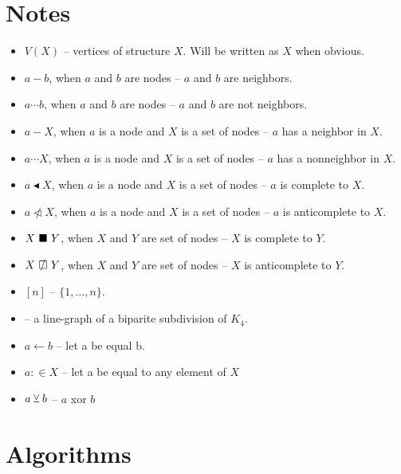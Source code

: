 

\author{Adrian Siwiec}
\date{\today{}}


\section{Notes}
\begin{itemize}
	\item $V(X)$ -- vertices of structure $X$. Will be written as $X$ when obvious.
	\item $a - b$, when $a$ and $b$ are nodes -- $a$ and $b$ are neighbors.
	\item $a \cdots b$, when $a$ and $b$ are nodes -- $a$ and $b$ are not neighbors.
	\item $a - X$, when $a$ is a node and $X$ is a set of nodes -- $a$ has a neighbor in $X$.
	\item $a \cdots X$, when $a$ is a node and $X$ is a set of nodes -- $a$ has a nonneighbor in $X$.
	\item $a \blacktriangleleft  X$, when $a$ is a node and $X$ is a set of nodes -- $a$ is complete to $X$.
	\item $a \ntriangleleft X$, when $a$ is a node and $X$ is a set of nodes -- $a$ is anticomplete to $X$.
	\item $X \ \blacksquare\  Y$, when $X$ and $Y$ are set of nodes -- $X$ is complete to $Y$.
	\item $X \setAntiComplete Y$, when $X$ and $Y$ are set of nodes -- $X$ is anticomplete to $Y$.
	\item $[n]$  -- $\{1, \ldots, n\}$.
	\item \LGBSK -- a line-graph of a biparite subdivision of $K_4$.
	\item $a \gets b$ -- let a be equal b.
	\item $a :\in X$ -- let a be equal to any element of $X$
	\item $a \veebar b$ -- $a$ xor $b$
\end{itemize}
	
\section{Algorithms}
\begin{algorithm}
\end{algorithm}
  



	



	

